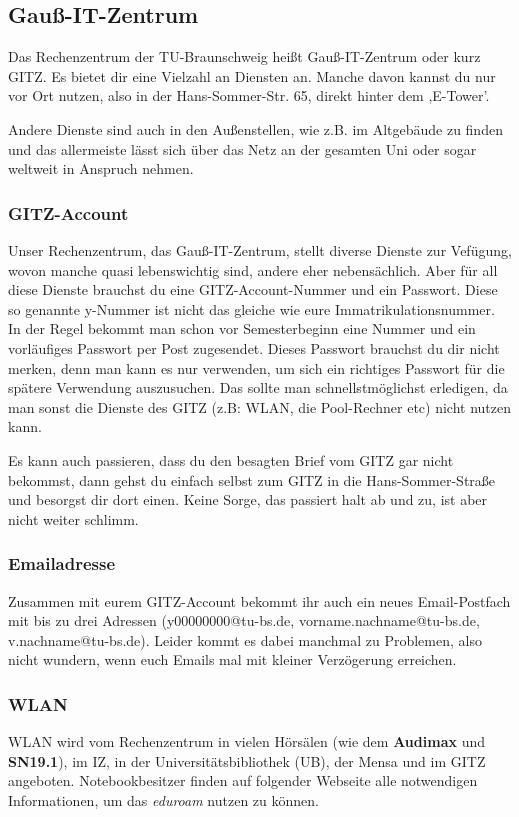 
\subsection{Gauß-IT-Zentrum}

	Das Rechenzentrum der TU-Braunschweig heißt Gauß-IT-Zentrum oder kurz GITZ. Es bietet dir eine Vielzahl an Diensten an. Manche davon kannst du nur vor Ort nutzen, also in der Hans-Sommer-Str. 65, direkt hinter dem ,E-Tower'. 
	
	Andere Dienste sind auch in den Außenstellen, wie z.B. im
	Altgebäude zu finden und das allermeiste lässt sich über das Netz an der gesamten Uni oder sogar weltweit in Anspruch nehmen.

\subsubsection{GITZ-Account}
\label{todogitz}
	Unser Rechenzentrum, das Gauß-IT-Zentrum, stellt  diverse Dienste zur Vefügung, wovon manche quasi lebenswichtig sind, andere eher nebensächlich. Aber für all diese Dienste brauchst du eine GITZ-Account-Nummer und ein Passwort. Diese so genannte y-Nummer ist nicht das gleiche wie eure Immatrikulationsnummer. In der Regel bekommt man schon vor Semesterbeginn eine Nummer und ein vorläufiges Passwort per Post zugesendet. Dieses Passwort brauchst du dir nicht merken, denn man kann es nur verwenden, um  sich ein richtiges Passwort für die spätere Verwendung auszusuchen. Das sollte man schnellstmöglichst erledigen, da man sonst die Dienste des GITZ (z.B: WLAN, die Pool-Rechner etc) nicht nutzen kann. 
	
	Es kann auch passieren, dass du den besagten Brief vom GITZ  gar nicht bekommst, dann gehst du einfach selbst zum GITZ in die Hans-Sommer-Straße und besorgst dir dort einen. Keine Sorge, das passiert halt ab und zu, ist aber nicht weiter schlimm.

	\subsubsection{Emailadresse}
		Zusammen mit eurem GITZ-Account bekommt ihr auch ein neues Email-Postfach mit bis zu drei Adressen (y00000000@tu-bs.de, vorname.nachname@tu-bs.de, v.nachname@tu-bs.de). Leider kommt es dabei manchmal zu Problemen, also nicht wundern, wenn euch Emails mal mit kleiner Verzögerung erreichen. 

	\subsubsection{WLAN}
		\label{wlan}
		WLAN wird vom Rechenzentrum in vielen Hörsälen (wie dem \textbf{Audimax} und \textbf{SN19.1}), im IZ, in der Universitätsbibliothek (UB), der Mensa und im GITZ angeboten. Notebookbesitzer finden auf folgender Webseite alle notwendigen Informationen, um das \emph{eduroam} nutzen zu können. 


